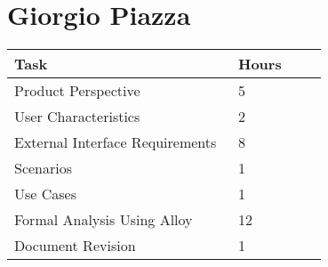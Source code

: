 \section{Giorgio Piazza}
\vspace{1mm}
\begin{center}
	\begin{tabular}{@{}p{0.5\linewidth} p{0.2\linewidth}@{}}
		\hline
		\textbf{Task} & \textbf{Hours} \\ \hline
		Product Perspective & 5 \\ \hline
		User Characteristics & 2 \\ \hline
		External Interface Requirements & 8 \\ \hline
		Scenarios & 1\\ \hline
		Use Cases & 1\\ \hline
		Formal Analysis Using Alloy & 12 \\ \hline
		Document Revision & 1\\ \hline
	\end{tabular}
\end{center}